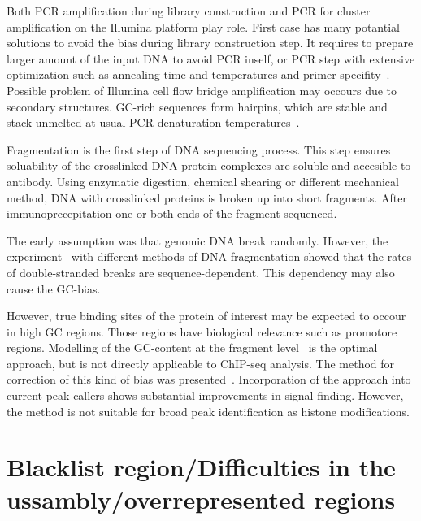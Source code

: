 Both PCR amplification during library construction and PCR for cluster amplification on the Illumina platform play role. 
First case has many potantial solutions to avoid the bias during library construction step.
It requires to prepare larger amount of the input DNA to avoid PCR inself, or PCR step with extensive optimization such as annealing time and temperatures and primer specifity~\cite{aird2011analyzing}.
Possible problem of Illumina cell flow bridge amplification may occours due to secondary structures.
GC-rich sequences form hairpins, which are stable and stack unmelted at usual PCR denaturation temperatures~\cite{stein2010nucleosome}.



Fragmentation is the first step of DNA sequencing process.
This step ensures soluability of the crosslinked DNA-protein complexes are soluble and accesible to antibody.
Using enzymatic digestion, chemical shearing or different mechanical method, DNA with crosslinked proteins is broken up into short fragments.
After immunoprecepitation one or both ends of the fragment sequenced.

The early assumption was that genomic DNA break randomly.
However, the experiment~\cite{poptsova2014non} with different methods of DNA fragmentation showed that the rates of double-stranded breaks are sequence-dependent.
This dependency may also cause the GC-bias. 


However, true binding sites of the protein of interest may be expected to occour in high GC regions.
Those regions have biological relevance such as promotore regions.
Modelling of the GC-content at the fragment level~\cite{benjamini2012summarizing} is the optimal approach, but is not directly applicable to ChIP-seq analysis.
The method for correction of this kind of bias was presented~\cite{teng2017accounting}.
Incorporation of the approach into current peak callers shows substantial improvements in signal finding.
However, the method is not suitable for broad peak identification as histone modifications.





\section{Blacklist region/Difficulties in the ussambly/overrepresented regions}

